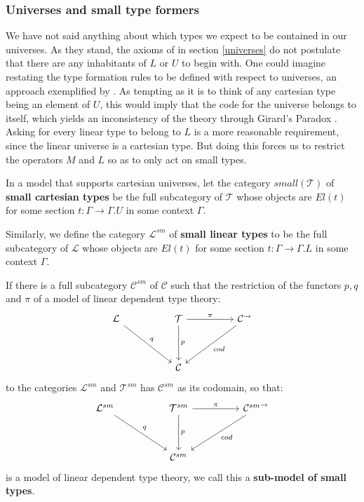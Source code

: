 \subsubsection{Universes and small type formers}\label{universesML}
We have not said anything about which types we expect to be contained in our universes. As they stand, the axioms of in section \ref{universes} do not postulate that there are any inhabitants of $L$ or $U$ to begin with. One could imagine restating the type formation rules to be defined with respect to universes, an approach exemplified by \cite{krishnaswami}. As tempting as it is to think of any cartesian type being an element of $U$, this would imply that the code for the universe belongs to itself, which yields an inconsistency of the theory through Girard's Paradox \cite{hurkens}. Asking for every linear type to belong to $L$ is a more reasonable requirement, since the linear universe is a cartesian type. But doing this forces us to restrict the operators $M$ and $L$ so as to only act on small types.
\begin{defn}In a model that supports cartesian universes, let the category $small(\mathcal{T})$ of \textbf{small cartesian types} be the full subcategory of $\mathcal{T}$ whose objects are $El(t)$ for some section $t : \Gamma \to \Gamma.U$ in some context $\Gamma$.
\end{defn}
\begin{defn}
  Similarly, we define the category $\mathcal{L}^{sm}$ of \textbf{small linear types} to be the full subcategory of $\mathcal{L}$ whose objects are $El(t)$ for some section $t : \Gamma \to \Gamma.L$ in some context $\Gamma$.
\end{defn}
\begin{defn}
  If there is a full subcategory $\mathcal{C}^{sm}$ of $\mathcal{C}$ such that the restriction of the functors $p, q$ and $\pi$ of a model of linear dependent type theory:
  \[
    \ti
    \mathcal{L} \ar[rd, "q"] & \mathcal{T}\ar[d, "p"] \ar[r, "\pi"] & \mathcal{C}^\to \ar[ld, "cod"]\\
    & \mathcal{C}
    \kz
  \]
  to the categories $\mathcal{L}^{sm}$ and $\mathcal{T}^{sm}$ has $\mathcal{C}^{sm}$ as its codomain, so that:
    \[
    \ti
    \mathcal{L}^{sm} \ar[rd, "q"] & \mathcal{T}^{sm}\ar[d, "p"] \ar[r, "\pi"] & {\mathcal{C}^{sm}}^\to \ar[ld, "cod"]\\
    & \mathcal{C}^{sm}
    \kz
  \]
  is a model of linear dependent type theory, we call this a \textbf{sub-model of small types}.
\end{defn}
